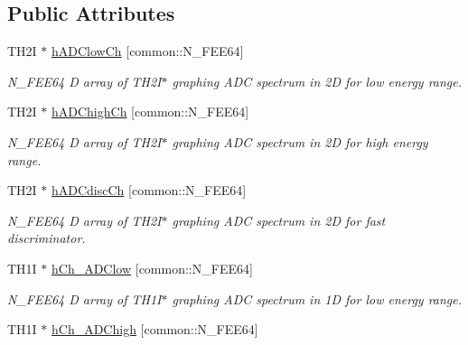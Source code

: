 \subsection*{Public Attributes}
\begin{DoxyCompactItemize}
\item 
\hypertarget{classAnalysis_a4563c7dc9e8dc450dd5652947123a6ee}{T\-H2\-I $\ast$ \hyperlink{classAnalysis_a4563c7dc9e8dc450dd5652947123a6ee}{h\-A\-D\-Clow\-Ch} \mbox{[}common\-::\-N\-\_\-\-F\-E\-E64\mbox{]}}\label{classAnalysis_a4563c7dc9e8dc450dd5652947123a6ee}

\begin{DoxyCompactList}\small\item\em N\-\_\-\-F\-E\-E64 D array of T\-H2\-I$\ast$ graphing A\-D\-C spectrum in 2\-D for low energy range. \end{DoxyCompactList}\item 
\hypertarget{classAnalysis_ae0292c6dffdfcc8ab15c296b1553829e}{T\-H2\-I $\ast$ \hyperlink{classAnalysis_ae0292c6dffdfcc8ab15c296b1553829e}{h\-A\-D\-Chigh\-Ch} \mbox{[}common\-::\-N\-\_\-\-F\-E\-E64\mbox{]}}\label{classAnalysis_ae0292c6dffdfcc8ab15c296b1553829e}

\begin{DoxyCompactList}\small\item\em N\-\_\-\-F\-E\-E64 D array of T\-H2\-I$\ast$ graphing A\-D\-C spectrum in 2\-D for high energy range. \end{DoxyCompactList}\item 
\hypertarget{classAnalysis_afcc03dd184a24fe5b33d053ba54a0438}{T\-H2\-I $\ast$ \hyperlink{classAnalysis_afcc03dd184a24fe5b33d053ba54a0438}{h\-A\-D\-Cdisc\-Ch} \mbox{[}common\-::\-N\-\_\-\-F\-E\-E64\mbox{]}}\label{classAnalysis_afcc03dd184a24fe5b33d053ba54a0438}

\begin{DoxyCompactList}\small\item\em N\-\_\-\-F\-E\-E64 D array of T\-H2\-I$\ast$ graphing A\-D\-C spectrum in 2\-D for fast discriminator. \end{DoxyCompactList}\item 
\hypertarget{classAnalysis_aec6281344bd8ee77b392f168defb858e}{T\-H1\-I $\ast$ \hyperlink{classAnalysis_aec6281344bd8ee77b392f168defb858e}{h\-Ch\-\_\-\-A\-D\-Clow} \mbox{[}common\-::\-N\-\_\-\-F\-E\-E64\mbox{]}}\label{classAnalysis_aec6281344bd8ee77b392f168defb858e}

\begin{DoxyCompactList}\small\item\em N\-\_\-\-F\-E\-E64 D array of T\-H1\-I$\ast$ graphing A\-D\-C spectrum in 1\-D for low energy range. \end{DoxyCompactList}\item 
\hypertarget{classAnalysis_a10ff082c45fa557c4531e9586d45e31c}{T\-H1\-I $\ast$ \hyperlink{classAnalysis_a10ff082c45fa557c4531e9586d45e31c}{h\-Ch\-\_\-\-A\-D\-Chigh} \mbox{[}common\-::\-N\-\_\-\-F\-E\-E64\mbox{]}}\label{classAnalysis_a10ff082c45fa557c4531e9586d45e31c}


\end{DoxyCompactItemize}
